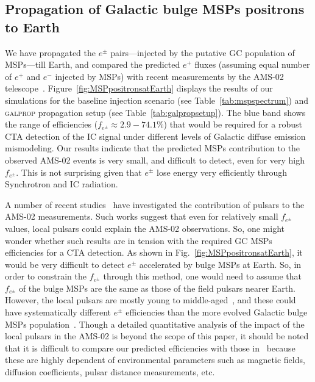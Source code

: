 \documentclass[doublespace,nopageskip]{VTthesis} %
\begin{document}
\begin{appendices}
 
 \section{Propagation of Galactic bulge MSPs positrons to Earth}
 
We have propagated the $e^\pm$ pairs---injected by the putative GC population of MSPs---till Earth, and compared the predicted $e^+$ fluxes (assuming equal number of $e^+$ and $e^-$ injected by MSPs) with recent measurements by the AMS-02 telescope~\citep{Aguilar:2021tos}. Figure~\ref{fig:MSPpositronsatEarth} displays the results of our simulations for the baseline injection scenario (see Table~\ref{tab:mspspectrum}) and \textsc{galprop} propagation setup (see Table~\ref{tab:galpropsetup}). The blue band shows the range of efficiencies ($f_{e^\pm}\approx 2.9-74.1\%$) that would be required for a robust CTA detection of the IC signal under different levels of Galactic diffuse emission mismodeling. Our results indicate that the predicted MSPs contribution to the observed AMS-02 events is very small, and difficult to detect, even for very high $f_{e^\pm}$. This is not surprising given that $e^\pm$ lose energy very efficiently through Synchrotron and IC radiation.

A number of recent studies~\citep[e.g.,][]{Cholis:2018izys, Manconi:2020ipm} have investigated the contribution of pulsars to the AMS-02 measurements. Such works suggest that even for relatively small $f_{e^\pm}$ values, local pulsars could explain the AMS-02 observations. So, one might wonder whether such results are in tension with the required GC MSPs efficiencies for a CTA detection. As shown in Fig.~\ref{fig:MSPpositronsatEarth}, it would be very difficult to detect $e^\pm$ accelerated by bulge MSPs at Earth. So, in order to constrain the $f_{e^\pm}$ through this method, one would need to assume that $f_{e^\pm}$ of the bulge MSPs are the same as those of the field pulsars nearer Earth. However, the local pulsars are mostly young to middle-aged~\citep{Delahaye:2010}, and these could have systematically different $e^\pm$ efficiencies than the more evolved Galactic bulge MSPs population~\citep{Song:2021zrs}. Though a detailed quantitative analysis of the impact of the local pulsars in the AMS-02 is beyond the scope of this paper, it should be noted that it is difficult to compare our predicted efficiencies with those in~\citep[e.g.,][]{Cholis:2018izys, Manconi:2020ipm} because these are highly dependent of environmental parameters such as magnetic fields, diffusion coefficients, pulsar distance measurements, etc.    


\end{appendices}
\end{document}
